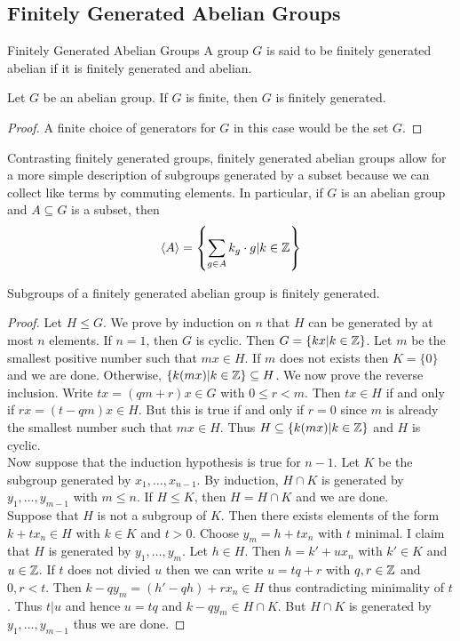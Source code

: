 \documentclass[a4paper]{article}
\begin{document}
\subsection{Finitely Generated Abelian Groups}
\begin{defn}{Finitely Generated Abelian Groups}{} A group $G$ is said to be finitely generated abelian if it is finitely generated and abelian. 
\end{defn}

\begin{lmm}{}{} Let $G$ be an abelian group. If $G$ is finite, then $G$ is finitely generated. 
\begin{proof}
A finite choice of generators for $G$ in this case would be the set $G$. 
\end{proof}
\end{lmm}

Contrasting finitely generated groups, finitely generated abelian groups allow for a more simple description of subgroups generated by a subset because we can collect like terms by commuting elements. In particular, if $G$ is an abelian group and $A\subseteq G$ is a subset, then $$\langle A\rangle=\left\{\sum_{g\in A}k_g\cdot g|k\in\mathbb{Z}\right\}$$

\begin{prp}{}{} Subgroups of a finitely generated abelian group is finitely generated. 
\begin{proof}
Let $H\leq G$. We prove by induction on $n$ that $H$ can be generated by at most $n$ elements. If $n=1$, then $G$ is cyclic. Then $G=\{kx|k\in\mathbb{Z}\}$. Let $m$ be the smallest positive number such that $mx\in H$. If $m$ does not exists then $K=\{0\}$ and we are done. Otherwise, $\{k(mx)|k\in\mathbb{Z}\}\subseteq H$. We now prove the reverse inclusion. Write $tx=(qm+r)x\in G$ with $0\leq r<m$. Then $tx\in H$ if and only if $rx=(t-qm)x\in H$. But this is true if and only if $r=0$ since $m$ is already the smallest number such that $mx\in H$. Thus $H\subseteq\{k(mx)|k\in\mathbb{Z}\}$ and $H$ is cyclic. \\
Now suppose that the induction hypothesis is true for $n-1$.  Let $K$ be the subgroup generated by $x_1,\dots,x_{n-1}$. By induction, $H\cap K$ is generated by $y_1,\dots,y_{m-1}$ with $m\leq n$. If $H\leq K$, then $H=H\cap K$ and we are done. \\
Suppose that $H$ is not a subgroup of $K$. Then there exists elements of the form $k+tx_n\in H$ with $k\in K$ and $t>0$. Choose $y_m=h+tx_n$ with $t$ minimal. I claim that $H$ is generated by $y_1,\dots,y_m$. Let $h\in H$. Then $h=k'+ux_n$ with $k'\in K$ and $u\in\mathbb{Z}$. If $t$ does not divied $u$ then we can write $u=tq+r$ with $q,r\in\mathbb{Z}$ and $0,r<t$. Then $k-qy_m=(h'-qh)+rx_n\in H$ thus contradicting minimality of $t$. Thus $t|u$ and hence $u=tq$ and $k-qy_m\in H\cap K$. But $H\cap K$ is generated by $y_1,\dots,y_{m-1}$ thus we are done. 
\end{proof}
\end{prp}
\end{document}
